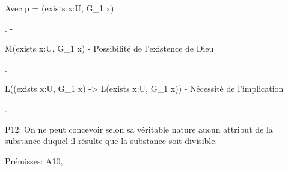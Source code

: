 \documentclass[10pt]{report}
\begin{document}
\begin{coqdoccode}
\coqdoceol
\coqdocindent{1.00em}
\begin{coqdoccomment}
\coqdocindent{0.50em}
Avec\coqdocindent{0.50em}
p\coqdocindent{0.50em}
=\coqdocindent{0.50em}
(exists\coqdocindent{0.50em}
x:U,\coqdocindent{0.50em}
G\_1\coqdocindent{0.50em}
x)\coqdocindent{0.50em}
\end{coqdoccomment}
\coqdoceol
\coqdocindent{1.00em}
 .\coqdoceol
\coqdocindent{1.00em}
- \begin{coqdoccomment}
\coqdocindent{0.50em}
M(exists\coqdocindent{0.50em}
x:U,\coqdocindent{0.50em}
G\_1\coqdocindent{0.50em}
x)\coqdocindent{0.50em}
-\coqdocindent{0.50em}
Possibilité\coqdocindent{0.50em}
de\coqdocindent{0.50em}
l'existence\coqdocindent{0.50em}
de\coqdocindent{0.50em}
Dieu\coqdocindent{0.50em}
\end{coqdoccomment}
\coqdoceol
\coqdocindent{2.00em}
 .\coqdoceol
\coqdocindent{1.00em}
- \begin{coqdoccomment}
\coqdocindent{0.50em}
L((exists\coqdocindent{0.50em}
x:U,\coqdocindent{0.50em}
G\_1\coqdocindent{0.50em}
x)\coqdocindent{0.50em}
->\coqdocindent{0.50em}
L(exists\coqdocindent{0.50em}
x:U,\coqdocindent{0.50em}
G\_1\coqdocindent{0.50em}
x))\coqdocindent{0.50em}
-\coqdocindent{0.50em}
Nécessité\coqdocindent{0.50em}
de\coqdocindent{0.50em}
l'implication\coqdocindent{0.50em}
\end{coqdoccomment}
\coqdoceol
\coqdocindent{2.00em}
 .\coqdoceol
\coqdocnoindent
{}.\coqdoceol
\coqdocemptyline
\coqdocnoindent
\begin{coqdoccomment}
\coqdocindent{0.50em}
P12:\coqdocindent{0.50em}
On\coqdocindent{0.50em}
ne\coqdocindent{0.50em}
peut\coqdocindent{0.50em}
concevoir\coqdocindent{0.50em}
selon\coqdocindent{0.50em}
sa\coqdocindent{0.50em}
véritable\coqdocindent{0.50em}
nature\coqdocindent{0.50em}
aucun\coqdocindent{0.50em}
attribut\coqdocindent{0.50em}
de\coqdocindent{0.50em}
la\coqdocindent{0.50em}
substance\coqdocindent{0.50em}
\coqdoceol
duquel\coqdocindent{0.50em}
il\coqdocindent{0.50em}
résulte\coqdocindent{0.50em}
que\coqdocindent{0.50em}
la\coqdocindent{0.50em}
substance\coqdocindent{0.50em}
soit\coqdocindent{0.50em}
divisible.\coqdocindent{0.50em}
\end{coqdoccomment}
\coqdoceol
\coqdocnoindent
\begin{coqdoccomment}
\coqdocindent{0.50em}
Prémisses:\coqdocindent{0.50em}
A10,\coqdocindent{0.50em}

\end{coqdoccomment}
\end{coqdoccode}
\end{document}
